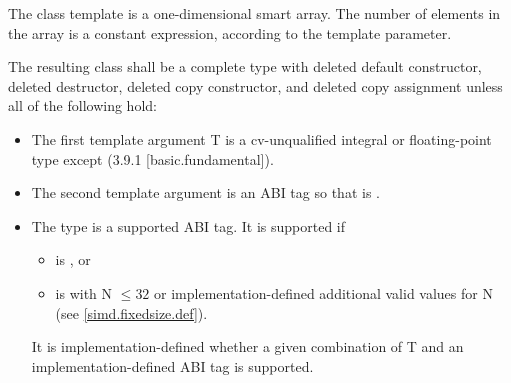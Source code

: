 

\pnum The class template \simd{} is a one-dimensional smart array.
The number of elements in the array is a constant expression, according to the  template parameter.

\newcommand\simdTypeRequirements[1]{
\pnum\label{#1.type requirements}\label{#1.deleted}%
The resulting class shall be a complete type with deleted default constructor, deleted destructor, deleted copy constructor, and deleted copy assignment unless all of the following hold:
\begin{itemize}
  \item The first template argument \type T is a cv-unqualified integral or floating-point type except \bool (3.9.1 [basic.fundamental]).
  \item The second template argument \type{Abi} is an ABI tag so that \code{is_abi_tag_v<Abi>} is \true.
  \item The \type{Abi} type is a supported ABI tag.
    It is supported if
    \begin{itemize}
      \item \type{Abi} is \type{simd_abi::scalar}, or
      \item \type{Abi} is \fixedsizeN with \code N $\le 32$ or implementation-defined additional valid values for \code N (see \ref{simd.fixedsize.def}).
    \end{itemize}
    It is implementation-defined whether a given combination of \type T and an implementation-defined ABI tag is supported.
\end{itemize}
}
\simdTypeRequirements{simd}


